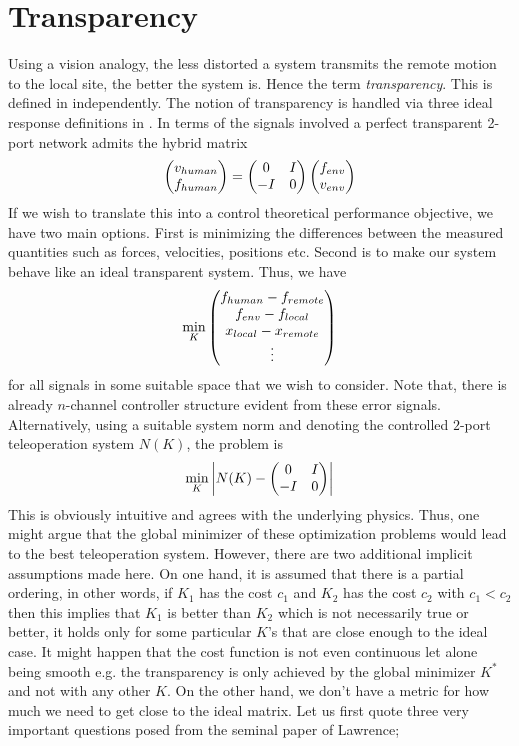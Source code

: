\section{Transparency}
Using a vision analogy, the less distorted a system transmits the remote motion to the local site, the better
the system is. Hence the term \emph{transparency}. This is defined in \cite{lawrence,yokokohjiyoshikawa} independently. 
The notion of transparency is handled via three ideal response definitions in \cite{yokokohjiyoshikawa}. In terms 
of the signals involved a perfect transparent 2-port network admits the hybrid matrix 
\[
\begin{pmatrix}v_{human}\\f_{human}\end{pmatrix}=\begin{pmatrix}0&I\\-I&0\end{pmatrix}\begin{pmatrix}f_{env}\\v_{env}\end{pmatrix}
\]
If we wish to translate this into a control theoretical performance objective, we have two main 
options. First is minimizing the differences between the measured quantities such as forces, velocities, positions
etc. Second is to make our system behave like an ideal transparent system. Thus, we have
\[
\min_K \begin{pmatrix}f_{human}-f_{remote}\\f_{env}-f_{local}\\x_{local}-x_{remote}\\\vdots\end{pmatrix} 
\]
for all signals in some suitable space that we wish to consider. Note that, there is already $n$-channel controller
structure evident from these error signals.  Alternatively, using a suitable system norm and denoting the controlled 
$2$-port teleoperation system $N(K)$, the problem is 
\[
\min_K \displaystyle \left|N(K) - \begin{pmatrix}0&I\\-I&0\end{pmatrix}\right|
\]
This is obviously intuitive and agrees with the underlying physics. Thus, one might argue that the global minimizer
of these optimization problems would lead to the best teleoperation system. However, there are two additional implicit 
assumptions made here. On one hand, it is assumed that there is a partial ordering, in other words, if $K_1$ has the cost 
$c_1$ and $K_2$ has the cost $c_2$ with $c_1<c_2$ then this implies that $K_1$ is better than $K_2$ which is not 
necessarily true or better, it holds only for some particular $K$'s that are close enough to the ideal case. It might 
happen that the cost function is not even continuous let alone being smooth e.g. the transparency is only achieved by 
the global minimizer $K^*$ and not with any other $K$. On the other hand, we don't have a metric for how much we need 
to get close to the ideal matrix. Let us first quote three very important questions posed from the seminal paper of Lawrence;
